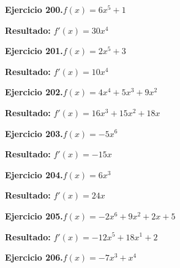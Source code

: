 \documentclass[10pt,a4paper]{article}
\begin{document}
\begin{ejbox}
\textbf{Ejercicio 200.}\quad $f(x) = 6x^{5} +1$
\end{ejbox}

\begin{solbox}
\textbf{Resultado:} \(\displaystyle f'(x) = 30x^{4}\)
\end{solbox}

\begin{ejbox}
\textbf{Ejercicio 201.}\quad $f(x) = 2x^{5} +3$
\end{ejbox}

\begin{solbox}
\textbf{Resultado:} \(\displaystyle f'(x) = 10x^{4}\)
\end{solbox}

\newpage
\begin{ejbox}
\textbf{Ejercicio 202.}\quad $f(x) = 4x^4 +5x^3 +9x^2$
\end{ejbox}

\begin{solbox}
\textbf{Resultado:} \(\displaystyle f'(x) = 16x^3 +15x^2 +18x\)
\end{solbox}

\begin{ejbox}
\textbf{Ejercicio 203.}\quad $f(x) = -5x^{6}$
\end{ejbox}

\begin{solbox}
\textbf{Resultado:} \(\displaystyle f'(x) = -15x\)
\end{solbox}

\begin{ejbox}
\textbf{Ejercicio 204.}\quad $f(x) = 6x^{3}$
\end{ejbox}

\begin{solbox}
\textbf{Resultado:} \(\displaystyle f'(x) = 24x\)
\end{solbox}

\newpage
\begin{ejbox}
\textbf{Ejercicio 205.}\quad $f(x) = -2x^{6} +9x^{2} +2x +5$
\end{ejbox}

\begin{solbox}
\textbf{Resultado:} \(\displaystyle f'(x) = -12x^{5} +18x^{1} +2\)
\end{solbox}

\begin{ejbox}
\textbf{Ejercicio 206.}\quad $f(x) = -7x^{3} + x^{4}$
\end{ejbox}
\end{document}
